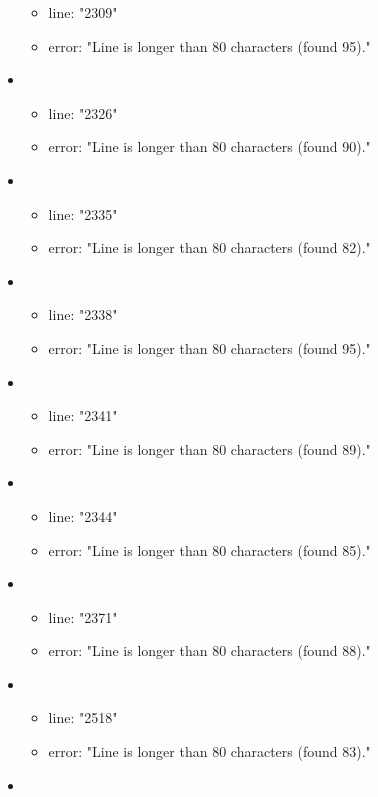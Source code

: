 \begin{itemize}
\begin{itemize}
		\item line: "2309" 
		\item error: "Line is longer than 80 characters (found 95)." 
	\end{itemize}
	\item 
	\begin{itemize} 
		\item line: "2326" 
		\item error: "Line is longer than 80 characters (found 90)." 
	\end{itemize}
	\item 
	\begin{itemize} 
		\item line: "2335" 
		\item error: "Line is longer than 80 characters (found 82)." 
	\end{itemize}
	\item 
	\begin{itemize} 
		\item line: "2338" 
		\item error: "Line is longer than 80 characters (found 95)." 
	\end{itemize}
	\item 
	\begin{itemize} 
		\item line: "2341" 
		\item error: "Line is longer than 80 characters (found 89)." 
	\end{itemize}
	\item 
	\begin{itemize} 
		\item line: "2344" 
		\item error: "Line is longer than 80 characters (found 85)." 
	\end{itemize}
	\item 
	\begin{itemize} 
		\item line: "2371" 
		\item error: "Line is longer than 80 characters (found 88)." 
	\end{itemize}
	\item 
	\begin{itemize} 
		\item line: "2518" 
		\item error: "Line is longer than 80 characters (found 83)." 
	\end{itemize}
	\item 
	\begin{itemize} 

\end{itemize}
\end{itemize}
